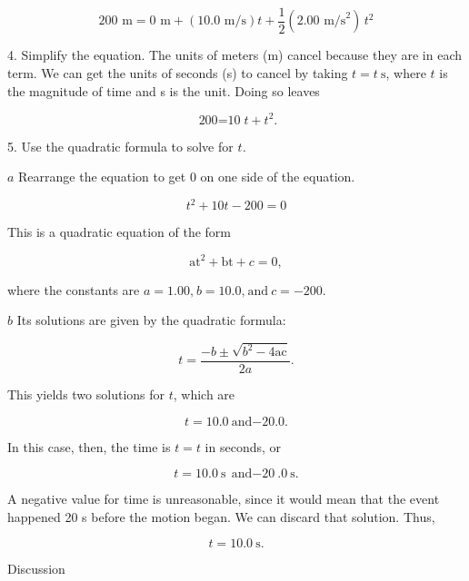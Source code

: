 \documentclass[
]{book}
\newenvironment{tinysection}{}{}
\begin{document}
\leavevmode\hypertarget{import-auto-id2179013}{}%
\[{{\text{200\ m} = {\text{0\ m} + \left( {\text{10}\text{.}\text{0\ m/s}} \right)}}{t + \frac{1}{2}}\left( {2\text{.}\text{00\ m/s}^{2}} \right)\, t^{2}}{}\]

4. Simplify the equation. The units of meters (m) cancel because they
are in each term. We can get the units of seconds (s) to cancel by
taking \({{t = t}\ \text{s}}{}\), where \(t{}\) is the magnitude of time and
s is the unit. Doing so leaves

\leavevmode\hypertarget{eip-635}{}%
\[{{{\text{200} = \text{10}}{t + t^{2}}}\text{.}}{}\]

5. Use the quadratic formula to solve for \(t{}\)\emph{.}

\(a\) Rearrange the equation to get 0 on one side of the equation.

\leavevmode\hypertarget{import-auto-id1680208}{}%
\[{{t^{2} + \text{10}}{{t - \text{200}} = 0}}{}\]

This is a quadratic equation of the form

\leavevmode\hypertarget{import-auto-id1680214}{}%
\[{{{{\text{at}^{2} + \text{bt}} + c} = 0},}{}\]

where the constants are
\({{a = 1}\text{.}\text{00,}\ {b = \text{10}}\text{.}\text{0,}\ \text{and}\ {c = {- \text{200}}}}{}\).

\(b\) Its solutions are given by the quadratic formula:

\leavevmode\hypertarget{import-auto-id2367246}{}%
\[{t = \frac{{- b} \pm \sqrt{{b^{2} - 4}\text{ac}}}{2a}}\text{.}\]

This yields two solutions for \(t{}\), which are

\leavevmode\hypertarget{import-auto-id1772100}{}%
\[{{{t = \text{10}}\text{.}0\ \text{and}{- \text{20}}\text{.}0}.}{}\]

In this case, then, the time is
\({t = t}{}\)\emph{}
in\emph{} seconds, or

\leavevmode\hypertarget{import-auto-id2175275}{}%
\[{{{t = \text{10}}\text{.}0\ \text{s}\ {\text{and} - \text{20}}\text{.}0\ \text{s}}.}{}\]

A negative value for time is unreasonable, since it would mean that the
event happened 20 s before the motion began. We can discard that
solution. Thus,

\leavevmode\hypertarget{import-auto-id2177316}{}%
\[{{{t = \text{10}}\text{.}0\ \text{s}}.}{}\]

\begin{tinysection}

{Discussion}

\end{tinysection}
\end{document}
